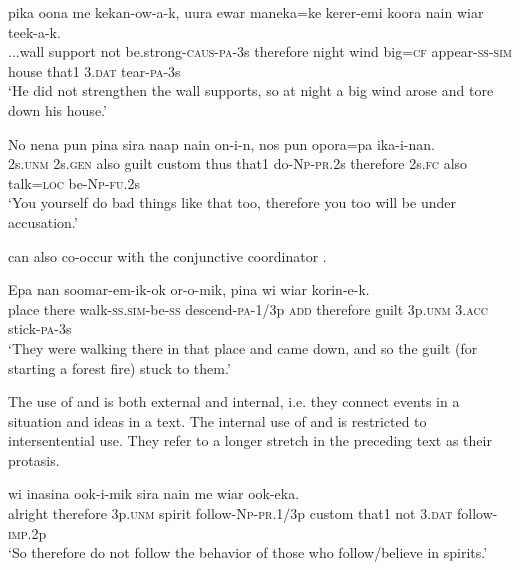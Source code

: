 \ea%
\label{ex:x1405}
\gll {\dots}pika  oona  me  kekan-ow-a-k,    uura ewar  maneka=ke  kerer-emi  koora  nain  wiar teek-a-k.\\
...wall  support  not  be.strong-\textsc{caus}-\textsc{pa}-3s  therefore  night wind  big=\textsc{cf}  appear-\textsc{ss}-\textsc{sim}  house  that1  3.\textsc{dat} tear-\textsc{pa}-3s\\
\glt`He did not strengthen the wall supports, so at night a big wind arose and tore down his house.'
\z


\ea%
\label{ex:x1408}
\gll No  nena  pun  pina  sira  naap  nain  on-i-n,   nos  pun  opora=pa  ika-i-nan.\\
2s.\textsc{unm}  2s.\textsc{gen}  also  guilt  custom  thus  that1  do-\textsc{Np}-\textsc{pr}.2s therefore  2s.\textsc{fc} also talk=\textsc{loc} be-\textsc{Np}-\textsc{fu}.2s\\
\glt`You yourself do bad things like that too, therefore you too will be under accusation.'
\z


 can also co-occur with the conjunctive coordinator . 

\ea%
\label{ex:x1403}
\gll Epa  nan  soomar-em-ik-ok  or-o-mik,     pina  wi  wiar  korin-e-k.  \\
place  there  walk-\textsc{ss}.\textsc{sim}-be-\textsc{ss} descend-\textsc{pa}-1/3p \textsc{add}  therefore  guilt  3p.\textsc{unm} 3.\textsc{acc} stick-\textsc{pa}-3s\\
\glt`They were walking there in that place and came down, and so the guilt (for starting a forest fire) stuck to them.'
\z


The use of  and  is both external and internal, i.e. they connect events in a situation and ideas in a text. The internal use of  and  is restricted to intersentential use. They refer to a longer stretch in the preceding text as their protasis.

\ea%
\label{ex:x1407}
\gll {}    wi  inasina  ook-i-mik sira  nain  me  wiar  ook-eka.  \\
alright  therefore  3p.\textsc{unm} spirit  follow-\textsc{Np}-\textsc{pr}.1/3p custom  that1  not  3.\textsc{dat} follow-\textsc{imp}.2p\\
\glt`So therefore do not follow the behavior of those who follow/believe in spirits.'
\z

